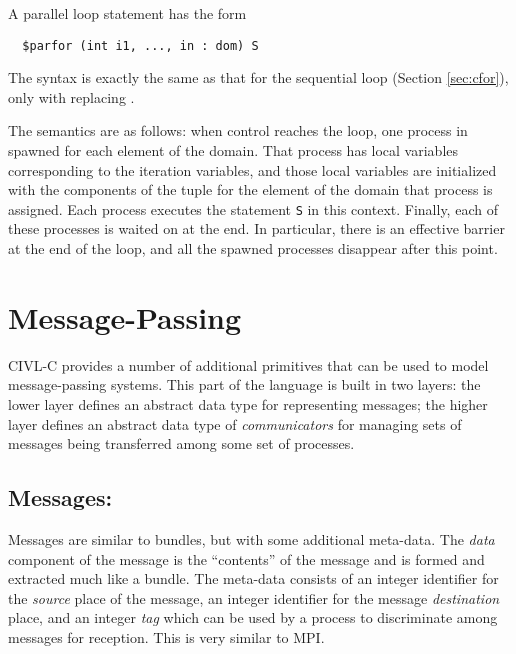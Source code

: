 A parallel loop statement has the form
\begin{verbatim}
  $parfor (int i1, ..., in : dom) S
\end{verbatim}
The syntax is exactly the same as that for the sequential loop \cfor
(Section \ref{sec:cfor}), only with \cparfor{} replacing \cfor.

The semantics are as follows: when control reaches the loop, one
process in spawned for each element of the domain.  That process has
local variables corresponding to the iteration variables, and those
local variables are initialized with the components of the tuple for
the element of the domain that process is assigned.  Each process
executes the statement \texttt{S} in this context.  Finally, each of
these processes is waited on at the end.  In particular, there is an
effective barrier at the end of the loop, and all the spawned
processes disappear after this point.

\section{Message-Passing}

CIVL-C provides a number of additional primitives that can be used to
model message-passing systems.  This part of the language is built in
two layers: the lower layer defines an abstract data type for
representing messages; the higher layer defines an abstract data type
of \emph{communicators} for managing sets of messages being
transferred among some set of processes.

\subsection{Messages: \cmessage}

Messages are similar to bundles, but with some additional meta-data.
The \emph{data} component of the message is the ``contents'' of the
message and is formed and extracted much like a bundle.  The meta-data
consists of an integer identifier for the \emph{source} place of the
message, an integer identifier for the message \emph{destination}
place, and an integer \emph{tag} which can be used by a process to
discriminate among messages for reception.  This is very similar to
MPI.

